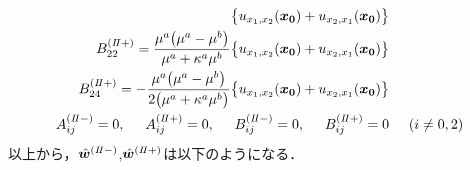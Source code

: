 \begin{align}
	\bigl\{u_{x_{1},x_{2}}(\bm{x_{0}})+u_{x_{2},x_{1}}(\bm{x_{0}})\bigr\}&
	\nonumber
	\\
	B_{22}^{(I\hspace{-.15em}I+)}=\frac{\mu^{a}\bigl(\mu^{a}-\mu^{b}\bigr)}{\mu^{a}+\kappa^{a}\mu^{b}}
	\bigl\{u_{x_{1},x_{2}}(\bm{x_{0}})+u_{x_{2},x_{1}}(\bm{x_{0}})\bigr\}&
	\nonumber\\
	B_{24}^{(I\hspace{-.15em}I+)}=-\frac{\mu^{a}\bigl(\mu^{a}-\mu^{b}\bigr)}{2\bigl(\mu^{a}+\kappa^{a}\mu^{b}\bigr)}
	\bigl\{u_{x_{1},x_{2}}(\bm{x_{0}})+u_{x_{2},x_{1}}(\bm{x_{0}})\bigr\}&
	\nonumber
	\\
	A_{ij}^{(I\hspace{-.15em}I-)}=0,\hspace{0.5cm}A_{ij}^{(I\hspace{-.15em}I+)}=0,\hspace{0.5cm}
	B_{ij}^{(I\hspace{-.15em}I-)}=0,\hspace{0.5cm}B_{ij}^{(I\hspace{-.15em}I+)}=0&\hspace{0.5cm}(i\neq0,2)
\end{align}
以上から，$\hat{\bm{w}}^{(I\hspace{-.15em}I-)}$,$\hat{\bm{w}}^{(I\hspace{-.15em}I+)}$は以下のようになる．
